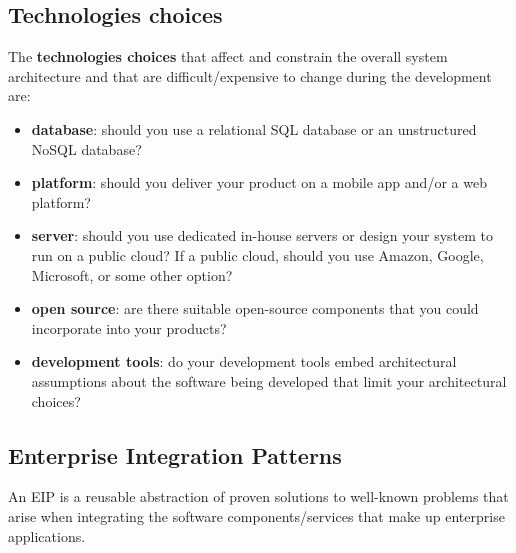 \subsection{Technologies choices}
The \textbf{technologies choices} that affect and constrain the overall system architecture and that are difficult/expensive to change during the development are:
\begin{itemize}
   \item \textbf{database}: should you use a relational SQL database or an unstructured NoSQL database?
   \item \textbf{platform}: should you deliver your product on a mobile app and/or a web platform?
   \item \textbf{server}: should you use dedicated in-house servers or design your system to run on a public cloud? If a public cloud, should you use Amazon, Google, Microsoft, or some other option?
   \item \textbf{open source}: are there suitable open-source components that you could incorporate into your products?
   \item \textbf{development tools}: do your development tools embed architectural assumptions about the software being developed that limit your architectural choices?
\end{itemize}

\subsection{Enterprise Integration Patterns}
An EIP is a reusable abstraction of proven solutions to well-known problems that arise when integrating the software components/services that make up enterprise applications.

